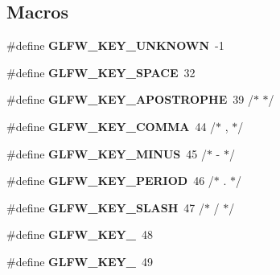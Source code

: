 \subsection*{Macros}
\begin{DoxyCompactItemize}
\item 
\mbox{\label{group__keys_ga99aacc875b6b27a072552631e13775c7}} 
\#define {\bfseries G\+L\+F\+W\+\_\+\+K\+E\+Y\+\_\+\+U\+N\+K\+N\+O\+WN}~-\/1
\item 
\mbox{\label{group__keys_gaddb2c23772b97fd7e26e8ee66f1ad014}} 
\#define {\bfseries G\+L\+F\+W\+\_\+\+K\+E\+Y\+\_\+\+S\+P\+A\+CE}~32
\item 
\mbox{\label{group__keys_ga6059b0b048ba6980b6107fffbd3b4b24}} 
\#define {\bfseries G\+L\+F\+W\+\_\+\+K\+E\+Y\+\_\+\+A\+P\+O\+S\+T\+R\+O\+P\+HE}~39  /$\ast$ \textquotesingle{} $\ast$/
\item 
\mbox{\label{group__keys_gab3d5d72e59d3055f494627b0a524926c}} 
\#define {\bfseries G\+L\+F\+W\+\_\+\+K\+E\+Y\+\_\+\+C\+O\+M\+MA}~44  /$\ast$ , $\ast$/
\item 
\mbox{\label{group__keys_gac556b360f7f6fca4b70ba0aecf313fd4}} 
\#define {\bfseries G\+L\+F\+W\+\_\+\+K\+E\+Y\+\_\+\+M\+I\+N\+US}~45  /$\ast$ -\/ $\ast$/
\item 
\mbox{\label{group__keys_ga37e296b650eab419fc474ff69033d927}} 
\#define {\bfseries G\+L\+F\+W\+\_\+\+K\+E\+Y\+\_\+\+P\+E\+R\+I\+OD}~46  /$\ast$ . $\ast$/
\item 
\mbox{\label{group__keys_gadf3d753b2d479148d711de34b83fd0db}} 
\#define {\bfseries G\+L\+F\+W\+\_\+\+K\+E\+Y\+\_\+\+S\+L\+A\+SH}~47  /$\ast$ / $\ast$/
\item 
\mbox{\label{group__keys_ga50391730e9d7112ad4fd42d0bd1597c1}} 
\#define {\bfseries G\+L\+F\+W\+\_\+\+K\+E\+Y\+\_}~48
\item 
\mbox{\label{group__keys_ga05e4cae9ddb8d40cf6d82c8f11f2502f}} 
\#define {\bfseries G\+L\+F\+W\+\_\+\+K\+E\+Y\+\_}~49
\item 
\mbox{\label{group__keys_gadc8e66b3a4c4b5c39ad1305cf852863c}} 

\end{DoxyCompactItemize}
